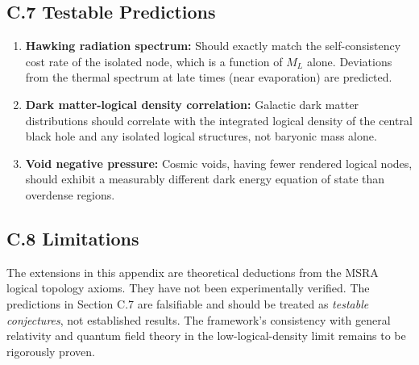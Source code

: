\documentclass[11pt,a4paper]{article}
\begin{document}
\subsection*{C.7 Testable Predictions}

\begin{enumerate}
\item \textbf{Hawking radiation spectrum:} Should exactly match the self-consistency cost rate of the isolated node, which is a function of $M_L$ alone. Deviations from the thermal spectrum at late times (near evaporation) are predicted.
\item \textbf{Dark matter-logical density correlation:} Galactic dark matter distributions should correlate with the integrated logical density of the central black hole and any isolated logical structures, not baryonic mass alone.
\item \textbf{Void negative pressure:} Cosmic voids, having fewer rendered logical nodes, should exhibit a measurably different dark energy equation of state than overdense regions.
\end{enumerate}

\subsection*{C.8 Limitations}

The extensions in this appendix are theoretical deductions from the MSRA logical topology axioms. They have not been experimentally verified. The predictions in Section C.7 are falsifiable and should be treated as \textit{testable conjectures}, not established results. The framework's consistency with general relativity and quantum field theory in the low-logical-density limit remains to be rigorously proven.
\end{document}
